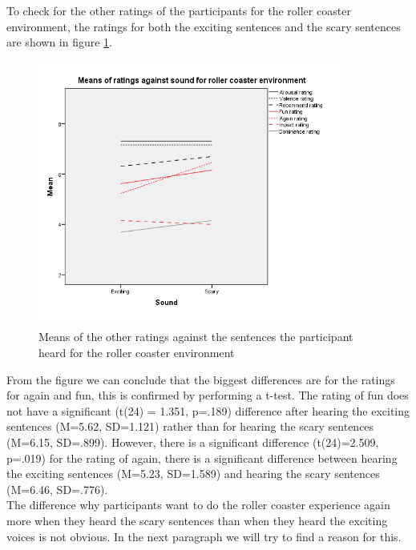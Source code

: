 \documentclass[Results.tex]{subfiles}
\begin{document}
To check for the other ratings of the participants for the roller coaster environment, the ratings for both the exciting sentences and the scary sentences are shown in figure \ref{fig:Ratings2_sound_RC}. 

\begin{figure}[H]
	\centering
		\includegraphics[width=0.90\textwidth]{Section_1/Figures/Ratings2_sound_RC.png}
	\caption{Means of the other ratings against the sentences the participant heard for the roller coaster environment}
	\label{fig:Ratings2_sound_RC}
\end{figure}

From the figure we can conclude that the biggest differences are for the ratings for again and fun, this is confirmed by performing a t-test. The rating of fun does not have a significant (t(24) = 1.351, p=.189) difference after hearing the exciting sentences (M=5.62, SD=1.121) rather than for hearing the scary sentences (M=6.15, SD=.899). However, there is a significant difference (t(24)=2.509, p=.019) for the rating of again, there is a significant difference between hearing the exciting sentences (M=5.23, SD=1.589) and hearing the scary sentences (M=6.46, SD=.776). \\

The difference why participants want to do the roller coaster experience again more when they heard the scary sentences than when they heard the exciting voices is not obvious. In the next paragraph we will try to find a reason for this. 
\end{document}
